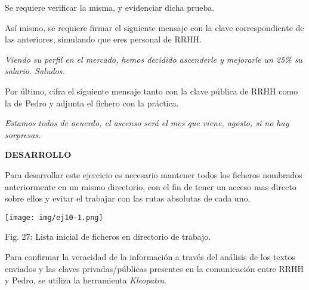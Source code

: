 \documentclass[12pt,oneside,a4paper]{book}
\begin{document}
\vspace{1em}

Se requiere verificar la misma, y evidenciar dicha prueba.

\vspace{1em}

Así mismo, se requiere firmar el siguiente mensaje con la clave correspondiente de las
anteriores, simulando que eres personal de RRHH.

\vspace{1em}

\textit{Viendo su perfil en el mercado, hemos decidido ascenderle y mejorarle un 25\% su
salario. Saludos.}

\vspace{1em}

Por último, cifra el siguiente mensaje tanto con la clave pública de RRHH como la de Pedro y
adjunta el fichero con la práctica.

\vspace{1em}

\textit{Estamos todos de acuerdo, el ascenso será el mes que viene, agosto, si no hay
sorpresas.}

\vspace{2em}

\hspace{20pt} \textbf{DESARROLLO}

\vspace{1em}

\hspace{20pt}
Para desarrollar este ejercicio es necesario mantener todos los ficheros nombrados anteriormente en un mismo directorio, con el fin de tener un acceso mas directo sobre ellos y evitar el trabajar con las rutas absolutas de cada uno.

\newpage

\begin{center}
    \texttt{[image: img/ej10-1.png]}
    
\vspace{0.1em}
    
    Fig. 27: Lista inicial de ficheros en directorio de trabajo.
\end{center}

\vspace{2em}

\hspace{20pt}
Para confirmar la veracidad de la información a través del análisis de los textos enviados y las claves privadas/públicas presentes en la comunicación entre RRHH y Pedro, se utiliza la herramienta \textit{Kleopatra}.
\end{document}
